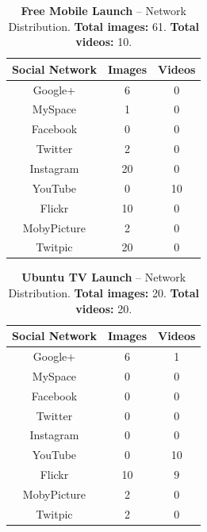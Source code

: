 \documentclass{acm_proc_article-sp}
\begin{document}
\begin{table}[htbp]
  \begin{tabular}{ | c | c | c | }
    \hline
    \textbf{Social Network} & \textbf{Images} & \textbf{Videos}\\
    \hline
    Google+ & 6 & 0\\
    MySpace & 1 & 0\\
    Facebook & 0 & 0\\
    Twitter & 2 & 0\\
    Instagram & 20 & 0\\
    YouTube & 0 & 10\\
    Flickr & 10 & 0\\ 
    MobyPicture & 2 & 0\\
    Twitpic & 20 & 0\\
    \hline
  \end{tabular}
  \label{tab:freemobile}
  \caption{\textbf{Free Mobile Launch} -- Network Distribution. \textbf{Total images:} 61. \textbf{Total videos:} 10.}
\end{table}

\begin{table}[htbp]
  \begin{tabular}{ | c | c | c | }
    \hline
    \textbf{Social Network} & \textbf{Images} & \textbf{Videos}\\
    \hline
    Google+ & 6 & 1\\
    MySpace & 0 & 0\\
    Facebook & 0 & 0\\
    Twitter & 0 & 0\\
    Instagram & 0 & 0\\
    YouTube & 0 & 10\\
    Flickr & 10 & 9\\ 
    MobyPicture & 2 & 0\\
    Twitpic & 2 & 0\\
    \hline
  \end{tabular}
  \label{tab:ubuntutv}
  \caption{\textbf{Ubuntu TV Launch} -- Network Distribution. \textbf{Total images:} 20. \textbf{Total videos:} 20.}
\end{table}
\end{document}
